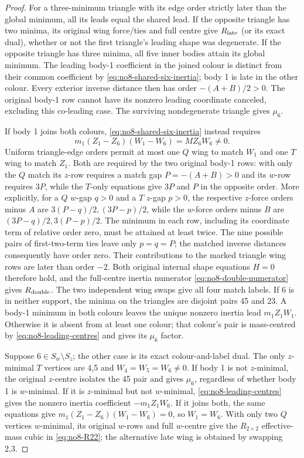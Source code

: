 \documentclass[11pt]{amsart}
\theoremstyle{remark}
\begin{document}
\begin{proof}
For a three-minimum triangle with its edge order strictly later than the global minimum, all its leads equal the shared lead. If the opposite triangle has two minima, its original wing force/ties and full centre give $R_{\rm late}$ (or its exact dual), whether or not the first triangle's leading shape was degenerate. If the opposite triangle has three minima, all five inner bodies attain its global minimum. The leading body-1 coefficient in the joined colour is distinct from their common coefficient by \eqref{eq:no8-shared-six-inertia}; body 1 is late in the other colour. Every exterior inverse distance then has order $-(A+B)/2>0$. The original body-1 row cannot have its nonzero leading coordinate canceled, excluding this co-leading case. The surviving nondegenerate triangle gives $\mu_6$.

If body 1 joins both colours, \eqref{eq:no8-shared-six-inertia} instead requires
\[
m_1(Z_1-Z_6)(W_1-W_6)=MZ_6W_6\ne0.
\]
Uniform triangle-edge orders permit at most one $Q$ wing to match $W_1$ and one $T$ wing to match $Z_1$. Both are required by the two original body-1 rows: with only the $Q$ match its $z$-row requires a match gap $P=-(A+B)>0$ and its $w$-row requires $3P$, while the $T$-only equations give $3P$ and $P$ in the opposite order. More explicitly, for a $Q$ $w$-gap $q>0$ and a $T$ $z$-gap $p>0$, the respective $z$-force orders minus $A$ are $3(P-q)/2,(3P-p)/2$, while the $w$-force orders minus $B$ are $(3P-q)/2,3(P-p)/2$. The minimum in each row, including its coordinate term of relative order zero, must be attained at least twice. The nine possible pairs of first-two-term ties leave only $p=q=P$; the matched inverse distances consequently have order zero. Their contributions to the marked triangle wing rows are later than order $-2$. Both original internal shape equations $H=0$ therefore hold, and the full-centre inertia numerator \eqref{eq:no8-double-numerator} gives $R_{\rm double}$. The two independent wing swaps give all four match labels.
If $6$ is in neither support, the minima on the triangles are disjoint pairs 45 and 23. A body-1 minimum in both colours leaves the unique nonzero inertia lead $m_1Z_1W_1$. Otherwise it is absent from at least one colour; that colour's pair is mass-centred by \eqref{eq:no8-leading-centres} and gives its $\mu_6$ factor.

Suppose $6\in S_w\setminus S_z$; the other case is its exact colour-and-label dual. The only $z$-minimal $T$ vertices are 4,5 and $W_4=W_5=W_6\ne0$. If body 1 is not $z$-minimal, the original $z$-centre isolates the 45 pair and gives $\mu_6$, regardless of whether body 1 is $w$-minimal. If it is $z$-minimal but not $w$-minimal, \eqref{eq:no8-leading-centres} gives the nonzero inertia coefficient $-m_1Z_1W_6$. If it joins both, the same equations give $m_1(Z_1-Z_6)(W_1-W_6)=0$, so $W_1=W_6$. With only two $Q$ vertices $w$-minimal, its original $w$-rows and full $w$-centre give the $R_{2\times2}$ effective-mass cubic in \eqref{eq:no8-R22}; the alternative late wing is obtained by swapping 2,3.


\end{proof}
\end{document}
